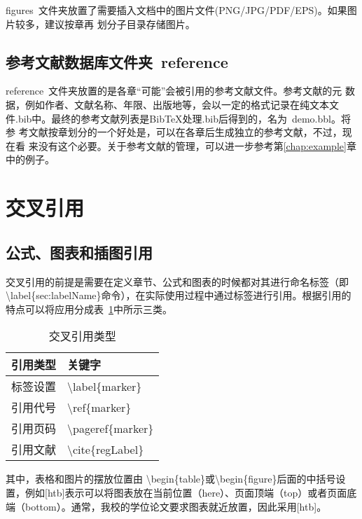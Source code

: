 figures~文件夹放置了需要插入文档中的图片文件(PNG/JPG/PDF/EPS)。如果图片较多，建议按章再
划分子目录存储图片。

\subsection{参考文献数据库文件夹~reference}
\label{sec:bibdir}

reference~文件夹放置的是各章``可能''会被引用的参考文献文件。参考文献的元
数据，例如作者、文献名称、年限、出版地等，会以一定的格式记录在纯文本文
件.bib中。最终的参考文献列表是BibTeX处理.bib后得到的，名为~demo.bbl。将参
考文献按章划分的一个好处是，可以在各章后生成独立的参考文献，不过，现在看
来没有这个必要。关于参考文献的管理，可以进一步参考第\ref{chap:example}章
中的例子。



\section{交叉引用}
\subsection{公式、图表和插图引用}
\label{sec:refofFigAndTab}
交叉引用的前提是需要在定义章节、公式和图表的时候都对其进行命名标签（即\textbackslash label\{sec:labelName\}命令），在实际使用过程中通过标签进行引用。根据引用的特点可以将应用分成表~\ref{tab:citeType}中所示三类。

\begin{table}[htb]
 \centering
  \caption{交叉引用类型}       %
  \label{tab:citeType}    %
  \begin{tabular}{cl}
    \hline
    引用类型     & 关键字     \\
    \hline
    标签设置        & \textbackslash label\{marker\}  \\
    引用代号        & \textbackslash ref\{marker\}    \\
    引用页码        & \textbackslash pageref\{marker\} \\
    引用文献        & \textbackslash cite\{regLabel\} \\
    \hline
  \end{tabular}
\end{table}

其中，表格和图片的摆放位置由 \textbackslash begin\{table\}或\textbackslash begin\{figure\}后面的中括号设置，例如[htb]表示可以将图表放在当前位置（here）、页面顶端（top）或者页面底端（bottom）。通常，我校的学位论文要求图表就近放置，因此采用[htb]。

